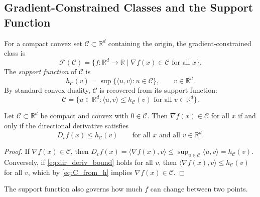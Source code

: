 \subsection{Gradient-Constrained Classes and the Support Function}\label{sec:tc:support}

For a compact convex set $\mathcal{C} \subset \mathbb{R}^d$ containing the origin, the gradient-constrained class is
\begin{equation*}
	\mathcal{F}(\mathcal{C}) = \bigl\{ f \colon \mathbb{R}^d \to \mathbb{R} \;\big|\; \nabla f(x) \in \mathcal{C} \text{ for all } x \bigr\}.
\end{equation*}
The \emph{support function} of $\mathcal{C}$ is
\begin{equation*}
	h_{\mathcal{C}}(v) = \sup\bigl\{ \langle u, v \rangle : u \in \mathcal{C} \bigr\}, \qquad v \in \mathbb{R}^d.
\end{equation*}
By standard convex duality, $\mathcal{C}$ is recovered from its support function:
\begin{equation}\label{eq:C_from_h}
	\mathcal{C} = \bigl\{ u \in \mathbb{R}^d : \langle u, v \rangle \leq h_{\mathcal{C}}(v) \text{ for all } v \in \mathbb{R}^d \bigr\}.
\end{equation}

\begin{lemma}\label{lem:gradient_support}
	Let $\mathcal{C} \subset \mathbb{R}^d$ be compact and convex with $0 \in \mathcal{C}$.
	Then $\nabla f(x) \in \mathcal{C}$ for all $x$ if and only if the directional derivative satisfies
	\begin{equation}\label{eq:dir_deriv_bound}
		D_v f(x) \leq h_{\mathcal{C}}(v) \qquad \text{for all } x \text{ and all } v \in \mathbb{R}^d.
	\end{equation}
\end{lemma}

\begin{proof}
	If $\nabla f(x) \in \mathcal{C}$, then $D_v f(x) = \langle \nabla f(x), v \rangle \leq \sup_{u \in \mathcal{C}} \langle u, v \rangle = h_{\mathcal{C}}(v)$.
	Conversely, if \eqref{eq:dir_deriv_bound} holds for all $v$, then $\langle \nabla f(x), v \rangle \leq h_{\mathcal{C}}(v)$ for all $v$, which by \eqref{eq:C_from_h} implies $\nabla f(x) \in \mathcal{C}$.
\end{proof}

The support function also governs how much $f$ can change between two points.

